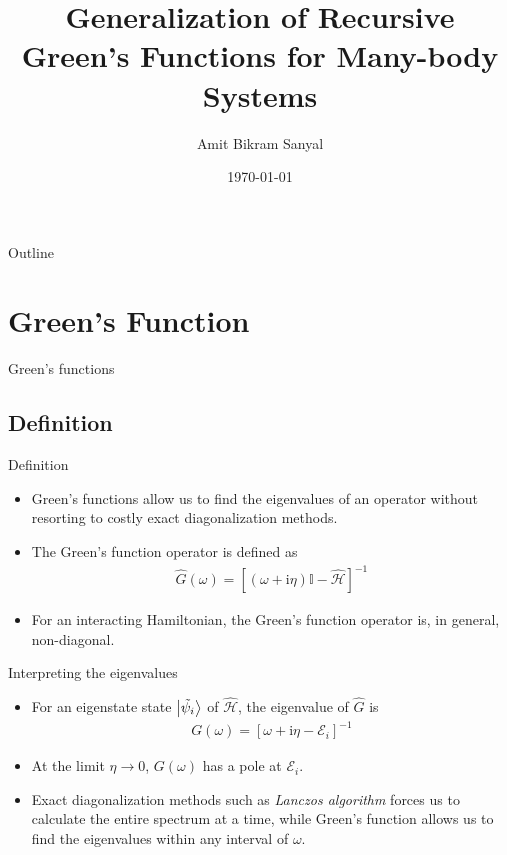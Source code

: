 \documentclass[usenames,dvipsnames]{beamer}
\title{Generalization of Recursive Green's Functions for Many-body Systems}
\author{Amit Bikram Sanyal\inst{1}}
\institute[] %
{
  \inst{1}%
  School of Physical Sciences\\
  National Institute of Science Education and Research
 }
\date{\today}
\newcommand{\I}{\mathrm{i}}
\newcommand{\ham}{\hat{\mathcal{H}}}
\begin{document}
\begin{frame}
  \titlepage
\end{frame}

\begin{frame}{Outline}
  \tableofcontents[pausesections]
\end{frame}

\section{Green's Function}
\begin{frame}
	\centering
	{\Huge Green's functions}
\end{frame}
\subsection{Definition}
\begin{frame}{Definition}
	\begin{itemize}
		\item{
			Green's functions allow us to find the eigenvalues of an operator without resorting to costly exact diagonalization methods.
			}
		\item{ 
			The Green's function operator is defined as\,\cite{coleman_2015}
			\begin{align}\label{eqn:gf-def}
				\hat{G}\left(\omega\right) = \left[ \left( \omega + \I \eta\right) \mathbb{I} - \ham \right]^{-1}
			\end{align}
			}
		\item{
			For an interacting Hamiltonian, the Green's function operator is, in general, non-diagonal.
		}
	\end{itemize}
\end{frame}

\begin{frame}{Interpreting the eigenvalues}
	\begin{itemize}
		\item{
		For an eigenstate state $ \ket{\tilde{\psi_i}} $ of $ \ham $, the eigenvalue of $ \hat{G} $ is
		\begin{align}
		G\left(\omega\right) = \left[ \omega + \I \eta - \mathcal{E}_i \right]^{-1}
		\end{align}
		}
		\item {
		At the limit $ \eta \rightarrow 0 $, $ G(\omega) $ has a pole at $ \mathcal{E}_{i} $.
		}
		\item {
			Exact diagonalization methods such as \textit{Lanczos algorithm} forces us to calculate the entire spectrum at a time, while Green's function allows us to find the eigenvalues within any interval of $\omega$.
		}
	\end{itemize}
\end{frame}
\end{document}
